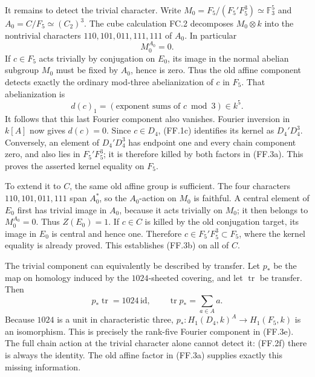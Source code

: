 It remains to detect the trivial character. Write
$M_0=F_5/(F_5'F_5^3)\simeq\mathbb F_3^5$ and
$A_0=C/F_5\simeq(C_2)^3$. The cube calculation FC.2
decomposes $M_0\otimes k$ into the nontrivial characters
$110,101,011,111,111$ of $A_0$. In particular
\[
                              M_0^{A_0}=0.
 \tag{FF.3d}
\]
If $c\in F_5$ acts trivially by conjugation on $E_0$, its
image in the normal abelian subgroup $M_0$ must be fixed
by $A_0$, hence is zero. Thus the old affine component
detects exactly the ordinary mod-three abelianization
of $c$ in $F_5$. That abelianization is
\[
             d(c)_1=(\text{exponent sums of }c\bmod3)
                         \in k^5.
 \tag{FF.3e}
\]
It follows that this last Fourier component also vanishes.
Fourier inversion in $k[A]$ now gives $d(c)=0$.
Since $c\in D_4$, (FF.1c) identifies its kernel as
$D_4'D_4^3$. Conversely, an element of $D_4'D_4^3$
has endpoint one and every chain component zero, and
also lies in $F_5'F_5^3$; it is therefore killed by both
factors in (FF.3a). This proves the asserted kernel equality
on $F_5$.

To extend it to $C$, the same old affine group is sufficient.
The four characters $110,101,011,111$ span $A_0^*$, so the
$A_0$-action on $M_0$ is faithful. A central element of $E_0$
first has trivial image in $A_0$, because it acts trivially
on $M_0$; it then belongs to $M_0^{A_0}=0$. Thus
$Z(E_0)=1$. If $c\in C$ is killed by the old conjugation
target, its image in $E_0$ is central and hence one. Therefore
$c\in F_5'F_5^3\subset F_5$, where the kernel equality is
already proved. This establishes (FF.3b) on all of $C$.

The trivial component can equivalently be described by
transfer. Let $p_*$ be the map on homology induced by
the $1024$-sheeted covering, and let $\operatorname{tr}$
be transfer. Then
\[
 p_*\operatorname{tr}=1024\,\mathrm{id},\qquad
 \operatorname{tr}p_*=\sum_{a\in A}a.
 \tag{FF.3f}
\]
Because $1024$ is a unit in characteristic three,
$p_*:H_1(D_4,k)^A\to H_1(F_5,k)$ is an isomorphism.
This is precisely the rank-five Fourier component in
(FF.3e). The full chain action at the trivial character
alone cannot detect it: (FF.2f) there is always the
identity. The old affine factor in (FF.3a) supplies
exactly this missing information.

